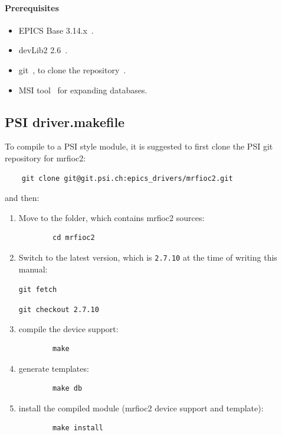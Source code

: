 \documentclass[12pt,a4paper]{article}
\newcommand{\latestDriverVersion}{2.7.10}
\begin{document}
\paragraph{Prerequisites}
\begin{itemize}
\item 
	EPICS Base 3.14.x~\cite{epics}.
\item 
	devLib2 2.6~\cite{devlib2}.
\item
	git~\cite{git}, to clone the repository~\cite{git_mrfioc2}.
\item 
	MSI tool~\cite{msi} for expanding databases.
\end{itemize}

\subsection{PSI driver.makefile}\label{sec:PSI driver.makefile}
To compile to a PSI style module, it is suggested to first clone the PSI git repository for mrfioc2:
\begin{verbatim}
	git clone git@git.psi.ch:epics_drivers/mrfioc2.git
\end{verbatim}
and then:
\begin{enumerate}
\item
	Move to the folder, which contains mrfioc2 sources:
	\begin{verbatim}
		cd mrfioc2
	\end{verbatim}
	
\item 
	Switch to the latest version, which is \texttt{\latestDriverVersion} at the time of writing this manual:
	
	\texttt{git fetch}
	
	\texttt{git checkout \latestDriverVersion}
	
\item
	compile the device support:
	\begin{verbatim}
		make
	\end{verbatim}

\item 
	generate templates:
	\begin{verbatim}
		make db
	\end{verbatim}

\item 
	install the compiled module (mrfioc2 device support and template):
	\begin{verbatim}
		make install
	\end{verbatim}
\end{enumerate}
\end{document}
